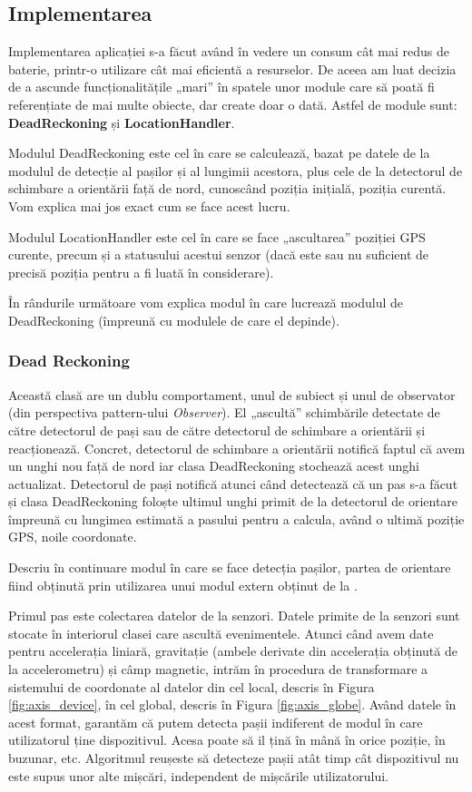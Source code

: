 \documentclass[12pt, a4paper, oneside]{article}
\begin{document}
\newpage
\subsection{Implementarea} \label{DescriereImplementare}
Implementarea aplicației s-a făcut având în vedere un consum cât mai redus de baterie, printr-o utilizare cât mai eficientă a resurselor. De aceea am luat decizia de a ascunde funcționalitățile „mari” în spatele unor module care să poată fi referențiate de mai multe obiecte, dar create doar o dată. Astfel de module sunt: \textbf{DeadReckoning} și \textbf{LocationHandler}. 

Modulul DeadReckoning este cel în care se calculează, bazat pe datele de la modulul de detecție al pașilor și al lungimii acestora, plus cele de la detectorul de schimbare a orientării față de nord, cunoscând poziția inițială, poziția curentă. Vom explica mai jos exact cum se face acest lucru.

Modulul LocationHandler este cel în care se face „ascultarea” poziției GPS curente, precum și a statusului acestui senzor (dacă este sau nu suficient de precisă poziția pentru a fi luată în considerare).

În rândurile următoare vom explica modul în care lucrează modulul de DeadReckoning (împreună cu modulele de care el depinde). 

\subsubsection{Dead Reckoning} \label{DeadReckoning}
Această clasă are un dublu comportament, unul de subiect și unul de observator (din perspectiva pattern-ului \textit{Observer}). El „ascultă” schimbările detectate de către detectorul de pași sau de către detectorul de schimbare a orientării și reacționează. Concret, detectorul de schimbare a orientării notifică faptul că avem un unghi nou față de nord iar clasa DeadReckoning stochează acest unghi actualizat. Detectorul de pași notifică atunci când detectează că un pas s-a făcut și clasa DeadReckoning foloște ultimul unghi primit de la detectorul de orientare împreună cu lungimea estimată a pasului pentru a calcula, având o ultimă poziție GPS, noile coordonate.

Descriu în continuare modul în care se face detecția pașilor, partea de orientare fiind obținută prin utilizarea unui modul extern obținut de la \cite{dsensor}.

Primul pas este colectarea datelor de la senzori. Datele primite de la senzori sunt stocate în interiorul clasei care ascultă evenimentele. Atunci când avem date pentru accelerația liniară, gravitație (ambele derivate din accelerația obținută de la accelerometru) și câmp magnetic, intrăm în procedura de transformare a sistemului de coordonate al datelor din cel local, descris în Figura \ref{fig:axis_device}, în cel global, descris în Figura \ref{fig:axis_globe}. Având datele în acest format, garantăm că putem detecta pașii indiferent de modul în care utilizatorul ține dispozitivul. Acesa poate să il țină în mână în orice poziție, în buzunar, etc. Algoritmul reușeste să detecteze pașii atât timp cât dispozitivul nu este supus unor alte mișcări, independent de mișcările utilizatorului.
\end{document}
